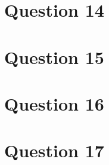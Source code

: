 \documentclass[11pt]{article}
\begin{document}

\section*{Question 14}


\section*{Question 15}


\section*{Question 16}


\section*{Question 17}

\end{document}
